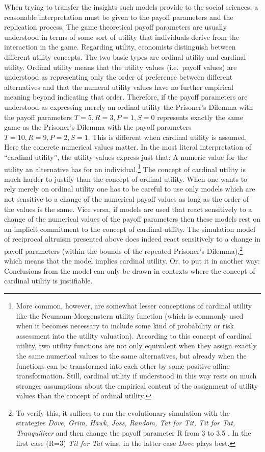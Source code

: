 When trying to transfer the insights such models provide to the social
sciences, a reasonable interpretation must be given to the payoff parameters
and the replication process. The game theoretical payoff parameters are
usually understood in terms of some sort of utility that individuals derive
from the interaction in the game. Regarding utility, economists distinguish
between different utility concepts. The two basic types are ordinal utility
and cardinal utility. Ordinal utility means that the utility values (i.e.\ 
payoff values) are understood as representing only the order of preference
between different alternatives and that the numeral utility values have no
further empirical meaning beyond indicating that order. Therefore, if the
payoff parameters are understood as expressing merely an ordinal utility the
Prisoner's Dilemma with the payoff parameters $T=5, R=3, P=1, S=0$ represents
exactly the same game as the Prisoner's Dilemma with the payoff parameters
$T=10, R=9, P=2, S=1$. This is different when cardinal utility is assumed.
Here the concrete numerical values matter. In the most literal interpretation
of ``cardinal utility'', the utility values express just that: A numeric value
for the utility an alternative has for an individual.\footnote{More common,
  however, are somewhat lesser conceptions of cardinal utility like the
  Neumann-Morgenstern utility function (which is commonly used when it becomes
  necessary to include some kind of probability or risk assessment into the
  utility valuation). According to this concept of cardinal utility, two
  utility functions are not only equivalent when they assign exactly the same
  numerical values to the same alternatives, but already when the functions
  can be transformed into each other by some positive affine transformation.
  Still, cardinal utility if understood in this way rests on much stronger
  assumptions about the empirical content of the assignment of utility values
  than the concept of ordinal utility.} The concept of cardinal utility is
much harder to justify than the concept of ordinal utility. When one wants to 
rely merely on ordinal utility one has to be careful to use only models which are not
sensitive to a change of the numerical payoff values as long as the order of
the values is the same.  Vice versa, if models are used that react sensitively
to a change of the numerical values of the payoff parameters then these models
rest on an implicit commitment to the concept of cardinal utility. The
simulation model of reciprocal altruism presented above does indeed react
sensitively to a change in payoff parameters (within the bounds of the
repeated Prisoner's Dilemma),\footnote{To verify this, it suffices to run the
  evolutionary simulation with the strategies {\em Dove, Grim, Hawk, Joss,
    Random, Tat for Tit, Tit for Tat, Tranquilizer} and then change the payoff
  parameter R from 3 to 3.5 . In the first case (R=3) {\em Tit for Tat} wins,
  in the latter case {\em Dove} plays best.}  which means that the model
implies cardinal utility. Or, to put it in another way: Conclusions from the
model can only be drawn in contexts where the concept of cardinal utility is
justifiable.

